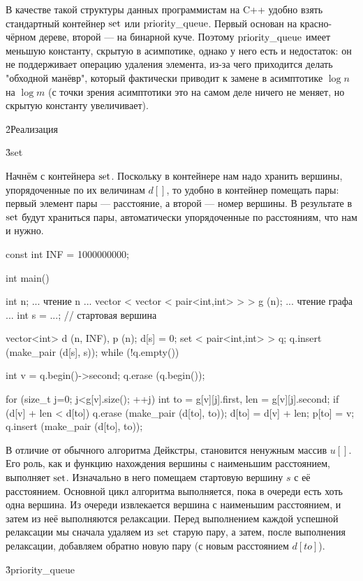 В качестве такой структуры данных программистам на C++ удобно взять стандартный контейнер $\rm set$ или $\rm priority\_queue$. Первый основан на красно-чёрном дереве, второй --- на бинарной куче. Поэтому $\rm priority\_queue$ имеет меньшую константу, скрытую в асимпотике, однако у него есть и недостаток: он не поддерживает операцию удаления элемента, из-за чего приходится делать "обходной манёвр", который фактически приводит к замене в асимптотике $\log n$ на $\log m$ (с точки зрения асимптотики это на самом деле ничего не меняет, но скрытую константу увеличивает).

\h2{Реализация}

\h3{set}

Начнём с контейнера $\rm set$. Поскольку в контейнере нам надо хранить вершины, упорядоченные по их величинам $d[]$, то удобно в контейнер помещать пары: первый элемент пары --- расстояние, а второй --- номер вершины. В результате в $\rm set$ будут храниться пары, автоматически упорядоченные по расстояниям, что нам и нужно.

\code
const int INF = 1000000000;

int main() {
	int n;
	... чтение n ...
	vector < vector < pair<int,int> > > g (n);
	... чтение графа ...
	int s = ...; // стартовая вершина

	vector<int> d (n, INF),  p (n);
	d[s] = 0;
	set < pair<int,int> > q;
	q.insert (make_pair (d[s], s));
	while (!q.empty()) {
		int v = q.begin()->second;
		q.erase (q.begin());

		for (size_t j=0; j<g[v].size(); ++j) {
			int to = g[v][j].first,
				len = g[v][j].second;
			if (d[v] + len < d[to]) {
				q.erase (make_pair (d[to], to));
				d[to] = d[v] + len;
				p[to] = v;
				q.insert (make_pair (d[to], to));
			}
		}
	}
}
\endcode

В отличие от обычного алгоритма Дейкстры, становится ненужным массив $u[]$. Его роль, как и функцию нахождения вершины с наименьшим расстоянием, выполняет $\rm set$. Изначально в него помещаем стартовую вершину $s$ с её расстоянием. Основной цикл алгоритма выполняется, пока в очереди есть хоть одна вершина. Из очереди извлекается вершина с наименьшим расстоянием, и затем из неё выполняются релаксации. Перед выполнением каждой успешной релаксации мы сначала удаляем из $\rm set$ старую пару, а затем, после выполнения релаксации, добавляем обратно новую пару (с новым расстоянием $d[to]$).

\h3{priority_queue}

